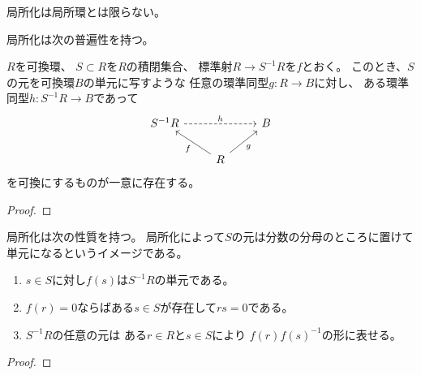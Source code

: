\documentclass[report]{jlreq}
\begin{document}
\begin{remark}[局所化は局所環とは限らない]
    局所化は局所環とは限らない。
\end{remark}

局所化は次の普遍性を持つ。

\begin{theorem}[局所化の普遍性]
    $R$を可換環、
    $S \subset R$を$R$の積閉集合、
    標準射$R \to S^{-1}R$を$f$とおく。
    このとき、$S$の元を可換環$B$の単元に写すような
    任意の環準同型$g \colon R \to B$に対し、
    ある環準同型$h \colon S^{-1}R \to B$であって
    \begin{equation}
        \begin{tikzcd}
            S^{-1}R
                \ar[dashed]{rr}{h}
                && B \\
            & R
                \ar{lu}{f}
                \ar{ru}[swap]{g}
        \end{tikzcd}
    \end{equation}
    を可換にするものが一意に存在する。
\end{theorem}

\begin{proof}
    \TODO{}
\end{proof}

局所化は次の性質を持つ。
局所化によって$S$の元は分数の分母のところに置けて
単元になるというイメージである。

\begin{proposition}[局所化の性質]
    \begin{enumerate}
        \item $s \in S$に対し$f(s)$は$S^{-1}R$の単元である。
        \item $f(r) = 0$ならばある$s \in S$が存在して$rs = 0$である。
        \item $S^{-1}R$の任意の元は
            ある$r \in R$と$s \in S$により
            $f(r)f(s)^{-1}$の形に表せる。
    \end{enumerate}
    \TODO{}
\end{proposition}

\begin{proof}
    \TODO{}
\end{proof}

\begin{definition}[saturation]
    \TODO{}
\end{definition}

\begin{definition}[extension]
    \TODO{}
\end{definition}
\end{document}
